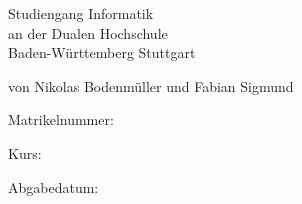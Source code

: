 \documentclass[12pt]{report}
\begin{document}
 
	
	\begin{titlepage}
		\thispagestyle{titlepage}
		\newcommand\HRule{\rule{\textwidth}{1pt}} %

		
		\begin{center}
			
			\vspace*{2cm}
			
			\begin{spacing}{2}
				{ \huge \bfseries \MakeUppercase{\meinTitel}}
			\end{spacing}
			
			\vspace*{1.5cm}
			
			\Large \artDerArbeit
			
			\vspace*{3cm}
			
			{\LARGE Studiengang Informatik}\\
			{\LARGE an der Dualen Hochschule}\\
			{\LARGE Baden-Württemberg Stuttgart}\\

			\vspace*{2.5cm}
			
			\Large von Nikolas Bodenmüller und Fabian Sigmund
			
			\large Matrikelnummer: \meineMatrikelNr  
			
			\large Kurs: \meinKurs
			
			\vspace*{1.5cm}
			
			\Large Abgabedatum: \abgabeDatum
			
			
		\end{center}
		
	\end{titlepage}



\fancypagestyle{plain}{
	\fancyfoot[L]{\meinName\\
		 \meinKurs}
	\fancyfoot[C]{Seite \thepage\ }%
	\fancyfoot[R]{\abgabeDatum}
}

\pagestyle{plain}
\fancyhead{}


\fancyhead[C]{\nouppercase\leftmark}
\end{document}
